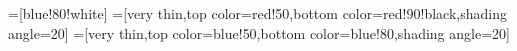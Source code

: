 =[blue!80!white]
=[very thin,top color=red!50,bottom color=red!90!black,shading angle=20]
=[very thin,top color=blue!50,bottom color=blue!80,shading angle=20]
\newcommand{\arrowIn}{
	\tikz \draw[-stealth] (-1pt,0) -- (1pt,0);
}
